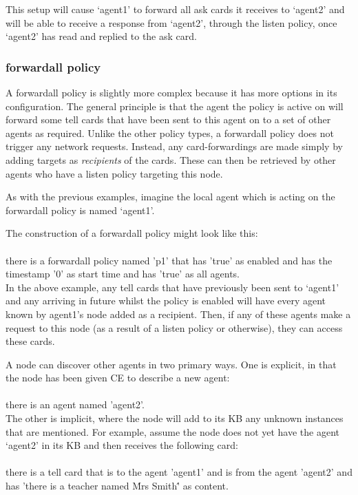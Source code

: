 \documentclass{scrartcl}
\newcommand{\ce}[1]{\textsf{#1}}
\begin{document}
This setup will cause `agent1' to forward all ask cards it receives to `agent2' and will be able to receive a response from `agent2', through the listen policy, once `agent2' has read and replied to the ask card.

\subsubsection{\ce{forwardall policy}}
A \ce{forwardall policy} is slightly more complex because it has more options in its configuration. The general principle is that the agent the policy is active on will forward some tell cards that have been sent to this agent on to a set of other agents as required. Unlike the other policy types, a \ce{forwardall policy} does not trigger any network requests. Instead, any card-forwardings are made simply by adding targets as \textit{recipients} of the cards. These can then be retrieved by other agents who have a \ce{listen policy} targeting this node.

As with the previous examples, imagine the local agent which is acting on the \ce{forwardall policy} is named `agent1'.

The construction of a \ce{forwardall policy} might look like this:\\
\\\ce{there is a forwardall policy named 'p1' that has 'true' as enabled and has the timestamp '0' as start time and has 'true' as all agents.}\\

In the above example, any tell cards that have previously been sent to `agent1' and any arriving in future whilst the policy is enabled will have every agent known by agent1's node added as a recipient. Then, if any of these agents make a request to this node (as a result of a \ce{listen policy} or otherwise), they can access these cards.

A node can discover other agents in two primary ways. One is explicit, in that the node has been given CE to describe a new agent:\\
\\\ce{there is an agent named 'agent2'.}\\

The other is implicit, where the node will add to its KB any unknown instances that are mentioned. For example, assume the node does not yet have the agent `agent2' in its KB and then receives the following card:\\
\\\ce{there is a tell card that is to the agent 'agent1' and is from the agent 'agent2' and has 'there is a teacher named \'Mrs Smith\'' as content.}\\
\end{document}
